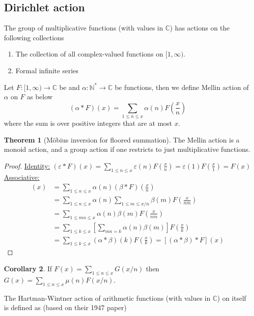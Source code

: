 \documentclass{article}
\theoremstyle{definition}
\newtheorem{theorem}{Theorem}[section]
\newtheorem{corollary}[theorem]{Corollary}
\begin{document}
\begin{shaded}
\newpage

\section{Dirichlet action}
The group of multiplicative functions (with values in $\mathbb{C}$) has actions on the following collections
\begin{enumerate}
	\item The collection of all complex-valued functions on $[1, \infty)$.
	\item Formal infinite series
\end{enumerate}
Let $F: [1, \infty) \to \mathbb{C}$ be and $\alpha: \mathbb{N}^* \to \mathbb{C}$ be functions, then we define Mellin action of $\alpha$ on $F$ as below
$$(\alpha * F) (x) = \sum_{1 \leq n \leq x} \alpha(n) F \left( \frac{x}{n} \right)$$
where the sum is over positive integers that are at most $x$.
\begin{theorem}[Möbius inversion for floored summation]
The Mellin action is a monoid action, and a group action if one restricts to just multiplicative functions.
\end{theorem}
\begin{proof}
\underline{Identity:} $(\varepsilon * F)(x) = \sum_{1 \leq n \leq x} \varepsilon(n) F \left( \frac{x}{n} \right) = \varepsilon(1) F \left( \frac{x}{1} \right) = F(x)$
\\
\underline{Associative:}
\begin{align*}
[\alpha * (\beta * F)] (x) & = \sum_{1 \leq n \leq x} \alpha(n) (\beta * F) \left( \frac{x}{n} \right)
\\
& = \sum_{1 \leq n \leq x} \alpha(n) \sum_{1 \leq m \leq x/n} \beta(m) F \left( \frac{x}{nm} \right)
\\
& = \sum_{1 \leq mn \leq x} \alpha(n) \beta(m) F \left( \frac{x}{nm} \right)
\\
& = \sum_{1 \leq k \leq x} \left[ \sum_{mn = k} \alpha(n) \beta(m) \right] F \left( \frac{x}{k} \right)
\\
& = \sum_{1 \leq k \leq x} (\alpha*\beta)(k) F \left( \frac{x}{k} \right) = [(\alpha*\beta) * F] (x)
\end{align*}
\end{proof}
\begin{corollary}
If $F(x) = \sum_{1 \leq n \leq x} G(x/n)$ then $G(x) = \sum_{1 \leq n \leq x} \mu(n) F(x/n)$.
\end{corollary}
The Hartman-Wintner action of arithmetic functions (with values in $\mathbb{C}$) on itself is defined as (based on their 1947 paper)

\end{shaded}
\end{document}
